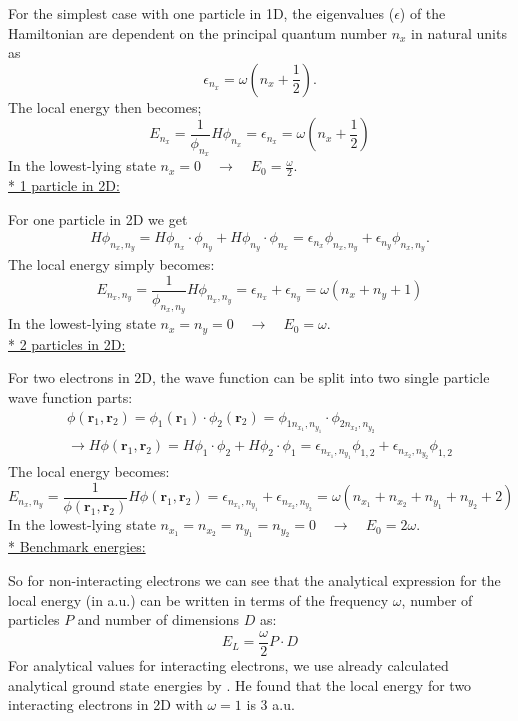 \documentclass[12pt,a4paper,english]{article}
\begin{document}
For the simplest case with one particle in 1D, the eigenvalues ($\epsilon$) of the Hamiltonian are dependent on the principal quantum number $n_x$ in natural units as
\begin{equation*}
\epsilon_{n_x}=\omega(n_x+\frac{1}{2}).
\end{equation*}
The local energy then becomes;
\begin{equation*}
E_{n_x}=\frac{1}{\phi_{n_x}}H\phi_{n_x}=\epsilon_{n_x}=\omega(n_x+\frac{1}{2})
\end{equation*}
In the lowest-lying state $n_x=0 \quad \rightarrow \quad E_0=\frac{\omega}{2}$.\\
\underline{* 1 particle in 2D:}

For one particle in 2D we get
\begin{align*}
H\phi_{n_x,n_y}=H\phi_{n_x}\cdot\phi_{n_y}+H\phi_{n_y}\cdot\phi_{n_x}= \epsilon_{n_x}\phi_{n_x,n_y}+\epsilon_{n_y}\phi_{n_x,n_y}.
\end{align*}
The local energy simply becomes:
\begin{equation*}
E_{n_x,n_y}=\frac{1}{\phi_{n_x,n_y}}H\phi_{n_x,n_y}=\epsilon_{n_x}+\epsilon_{n_y}=\omega(n_x+n_y+1)
\end{equation*}
In the lowest-lying state $n_x=n_y=0\quad \rightarrow \quad E_0=\omega$.\\
\underline{* 2 particles in 2D:}

For two electrons in 2D, the wave function can be split into two single particle wave function parts:
\begin{align*}
\phi(\textbf{r}_1, \textbf{r}_2)=\phi_1(\textbf{r}_1)\cdot\phi_2(\textbf{r}_2)=\phi_{1 n_{x_1}, n_{y_1}}\cdot\phi_{2 n_{x_2}, n_{y_2}}\\
\rightarrow H\phi(\textbf{r}_1, \textbf{r}_2)=H\phi_1\cdot\phi_2+H\phi_2\cdot\phi_1=\epsilon_{n_{x_1},n_{y_1}}\phi_{1,2}+\epsilon_{n_{x_2},n_{y_2}}\phi_{1,2}
\end{align*}
The local energy becomes:
\begin{equation*}
E_{n_x,n_y}=\frac{1}{\phi(\textbf{r}_1, \textbf{r}_2)}H\phi(\textbf{r}_1, \textbf{r}_2)=\epsilon_{n_{x_1},n_{y_1}}+\epsilon_{n_{x_2},n_{y_2}}=\omega(n_{x_1}+n_{x_2}+n_{y_1}+ n_{y_2}+2)
\end{equation*}
In the lowest-lying state $n_{x_1}=n_{x_2}=n_{y_1}=n_{y_2}=0\quad \rightarrow \quad E_0=2\omega$.\\
\underline{* Benchmark energies:}

So for non-interacting electrons we can see that the analytical expression for the local energy (in a.u.) can be written in terms of the frequency $\omega$, number of particles $P$ and number of dimensions $D$ as:
\begin{equation}
\label{eq:analytic_EL}
E_L=\frac{\omega}{2}P\cdot D
\end{equation}
For analytical values for interacting electrons, we use already calculated analytical ground state energies by \citet{taut1993two}. He found that the local energy for two interacting electrons in 2D with $\omega=1$ is 3 a.u.
\end{document}
